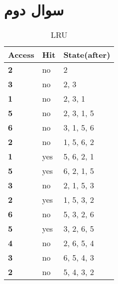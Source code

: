 \documentclass{article}
\begin{document}
\section{سوال دوم}
\begin{latin}
\begin{table}[H]
\caption{LRU}
\label{tab:my-table}
\begin{tabular}{|l|l|l|}
\hline
\textbf{Access} & \textbf{Hit} & \textbf{State(after)} \\ \hline
\textbf{2}      & no           & 2                     \\ \hline
\textbf{3}      & no           & 2, 3                  \\ \hline
\textbf{1}      & no           & 2, 3, 1               \\ \hline
\textbf{5}      & no           & 2, 3, 1, 5            \\ \hline
\textbf{6}      & no           & 3, 1, 5, 6            \\ \hline
\textbf{2}      & no           & 1, 5, 6, 2            \\ \hline
\textbf{1}      & yes          & 5, 6, 2, 1            \\ \hline
\textbf{5}      & yes          & 6, 2, 1, 5            \\ \hline
\textbf{3}      & no           & 2, 1, 5, 3            \\ \hline
\textbf{2}      & yes          & 1, 5, 3, 2            \\ \hline
\textbf{6}      & no           & 5, 3, 2, 6            \\ \hline
\textbf{5}      & yes          & 3, 2, 6, 5            \\ \hline
\textbf{4}      & no           & 2, 6, 5, 4            \\ \hline
\textbf{3}      & no           & 6, 5, 4, 3            \\ \hline
\textbf{2}      & no           & 5, 4, 3, 2            \\ \hline
\end{tabular}
\end{table}
\end{latin}
\end{document}
